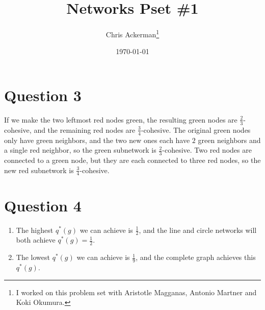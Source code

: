 
\newtheorem*{definition}{Definition}
\title{Networks Pset \#1}
\date{\today}

\author{Chris Ackerman\thanks{I worked on this problem set with Aristotle Magganas, Antonio Martner and Koki Okumura.}}

\maketitle

\section*{Question 3}

If we make the two leftmost red nodes green, the resulting green nodes are $\frac{2}{3}$-cohesive, and the remaining red nodes are $\frac{3}{4}$-cohesive. The original green nodes only have green neighbors, and the two new ones each have $2$ green neighbors and a single red neighbor, so the green subnetwork is $\frac{2}{3}$-cohesive. Two red nodes are connected to a green node, but they are each connected to three red nodes, so the new red subnetwork is $\frac{3}{4}$-cohesive.

\section*{Question 4}
\begin{enumerate}[label=\alph*)]
\item The highest $q^\ast(g)$ we can achieve is $\frac{1}{2}$, and the line and circle networks will both achieve $q^\ast(g) = \frac{1}{2}$.
  \item The lowest $q^\ast(g)$ we can achieve is $\frac{1}{9}$, and the complete graph achieves this $q^\ast(g)$.
\end{enumerate}

